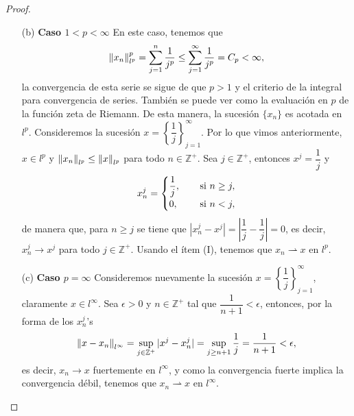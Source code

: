 \begin{proof}
\begin{enumerate}
\begin{enumerate}
            \item[(b)] \textbf{Caso $1<p<\infty$} En este caso, tenemos que 
            \begin{align*}
                \left\|x_n\right\|_{l^p}^p=\sum_{j=1}^n\dfrac{1}{j^p}\leq \sum_{j=1}^\infty\dfrac{1}{j^p}=C_p<\infty,
            \end{align*}
            la convergencia de esta serie se sigue de que $p>1$ y el criterio de la integral para convergencia de series. También se puede ver como la evaluación en $p$ de la función zeta de Riemann. De esta manera, la sucesión $\{x_n\}$ es acotada en $l^p$. Consideremos la sucesión $x=\left\{\dfrac{1}{j}\right\}_{j=1}^\infty$. Por lo que vimos anteriormente, $x \in l^p$ y $\left\|x_n\right\|_{l^p}\leq \left\|x\right\|_{l^p}$ para todo $n \in \mathbb{Z}^+$. Sea $j \in \mathbb{Z}^+$, entonces $x^j=\dfrac{1}{j}$ y
            \begin{align*}
                x_n^j=\begin{cases}
                    \dfrac{1}{j}, \hspace{3mm} &\text{ si } n\geq j,\\
                    0, &\text{ si } n<j,
                \end{cases}
            \end{align*}
            de manera que, para $n\geq j$ se tiene que $|x_n^j-x^j|=\left|\dfrac{1}{j}-\dfrac{1}{j}\right|=0$, es decir, $x_n^j\to x^j$ para todo $j \in \mathbb{Z}^+$. Usando el ítem (I), tenemos que $x_n\rightharpoonup x$ en $l^p$. 

            \item[(c)] \textbf{Caso $p=\infty$} Consideremos nuevamente la sucesión $x=\left\{\dfrac{1}{j}\right\}_{j=1}^\infty$, claramente $x \in l^\infty$. Sea $\epsilon>0$ y $n\in \mathbb{Z}^+$ tal que $\dfrac{1}{n+1}<\epsilon$, entonces, por la forma de los $x_n^j$'s
            \begin{align*}
                \left\|x-x_n\right\|_{l^\infty}=\sup_{j \in \mathbb{Z}^+}|x^j-x_n^j|=\sup_{j\geq n+1}\dfrac{1}{j}=\dfrac{1}{n+1}<\epsilon,
            \end{align*}
            es decir, $x_n\to x$ fuertemente en $l^\infty$, y como la convergencia fuerte implica la convergencia débil, tenemos que $x_n\rightharpoonup x$ en $l^\infty$.
        \end{enumerate}
    \end{enumerate}
\end{proof}
